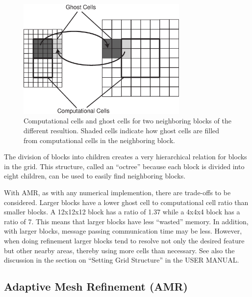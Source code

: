 \begin{figure}
\begin{center}
\includegraphics*[width=8.4cm]{message_pass_res_change.eps}
\end{center}
\caption{Computational cells and ghost cells for two
neighboring blocks of the different resultion.  Shaded cells indicate
how ghost cells are filled from computational cells in the neighboring block.}
\label{fig:message_pass_res_change}
\end{figure}

The division of blocks into children creates a very hierarchical
relation for blocks in the grid.  This structure, called an ``octree''
because each block is divided into eight children, can be used to
easily find neighboring blocks.

With AMR, as with any numerical implemention, there are trade-offs to
be considered.  Larger blocks have a lower ghost cell
to computational cell ratio than smaller blocks.  A 12x12x12 block has
a ratio of 1.37 while a 4x4x4 block has a ratio of 7.  This means that 
larger blocks have less ``wasted'' memory.  In addition, 
with larger blocks, message passing communication time may be less.
However, when doing
refinement larger blocks tend to resolve not only the desired feature
but other nearby areas, thereby using more cells than necessary.
See also the discussion in the section on ``Setting Grid Structure''
in the USER MANUAL.


\subsection{Adaptive Mesh Refinement (AMR) \label{sectio:amr}}

